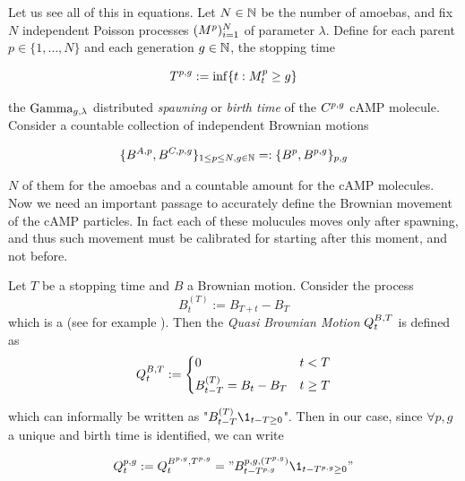 Let us see all of this in equations. Let $N\in\mathbb{N}$ be the number of amoebas, and fix $N$ independent Poisson processes $(M^p)_{i=1}^N$ of parameter $\lambda$.
Define for each parent $p \in \{1,\ldots,N\}$ and each generation $g \in \mathbb{N}$, the stopping time

\begin{equation}
T^{p,g} := \inf \{ t : M^p_t \geq g \}
\end{equation}

\ie the $\text{Gamma}_{g, \lambda}$ distributed \emph{spawning} or \emph{birth time} of the $C^{p,g}$ cAMP molecule.
Consider a countable collection of independent Brownian motions 

\begin{equation}
\{B^{A,p}, B^{C,p,g}\}_{1\leq p\leq N,g\in\mathbb{N}} =:\{B^p, B^{p,g}\}_{p,g}
\end{equation}

\ie $N$ of them for the amoebas and a countable amount for the cAMP molecules.
Now we need an important passage to accurately define the Brownian movement of the cAMP particles.
In fact each of these molucules moves only after spawning, and thus such movement must be calibrated for starting after this moment, and not before.

\begin{definition}
Let $T$ be a stopping time and $B$ a Brownian motion.
Consider the process
\begin{equation}
B_t^{(T)} := B_{T+t} - B_T
\end{equation}
which is a \Bm (see for example \citep[Theorem 2.20]{le-gall}).
Then the \emph{Quasi Brownian Motion} $Q_t^{B,T}$ is defined as
\begin{equation}
Q_t^{B,T} :=
\left\{
\begin{aligned}
& 0 
& t<T
\\
& B_{t-T}^{(T)} = B_{t} - B_{T}
& t \geq T
\end{aligned}
\right.
\end{equation}
\end{definition}\label{ch2:def:quasi-bm}

which can informally be written as "$B_{t-T}^{(T)}\1_{t-T\geq 0}$".
Then in our case, since $\forall p,g$ a unique \Bm and birth time is identified, we can write

\begin{equation}
\quasibm_t^{p,g} := \quasibm_t^{B^{p,g}, T^{p,g}}
= "B_{t-\btime^{p,g}}^{p,g,(\btime^{p,g})}\1_{t-\btime^{p,g}\geq 0}"
\end{equation}

